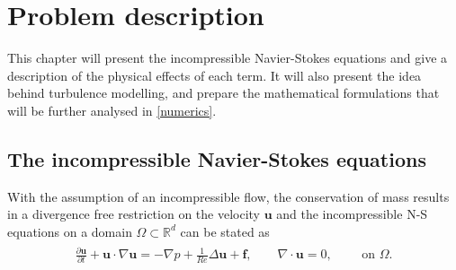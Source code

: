
\chapter{Problem description} %

\label{description} %


This chapter will present the incompressible Navier-Stokes equations and give a 
description of the physical effects of each term. It will also present the idea behind turbulence 
modelling, and prepare the mathematical formulations that will be further analysed in \cref{numerics}.

\section{The incompressible Navier-Stokes equations}

With the assumption of an incompressible flow, the conservation of mass 
results in a divergence free restriction on the velocity $\mathbf{u}$
and the incompressible N-S equations on a domain $\Omega\subset\mathbb{R}^d$ can be stated as  
%
\begin{align}
    \begin{split}
    \frac{\partial \mathbf{u}}{\partial t} + \mathbf{u}\cdot \nabla\mathbf{u} = 
    -\nabla p + \frac{1}{Re} \Delta\mathbf{u} + \mathbf{f}, \qquad 
    \nabla \cdot \mathbf{u} = 0, \qquad \text{ on } \Omega.
    \end{split}
    \label{eq:NS}
\end{align}
%


